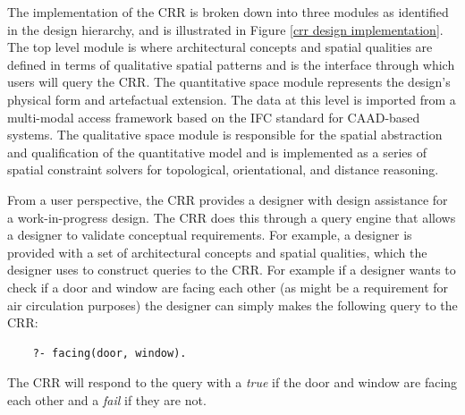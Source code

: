 \documentclass[12pt]{ucthesis}
\begin{document}
The implementation of the CRR is broken down into three modules as identified in the design hierarchy, and is illustrated in Figure \ref{crr design implementation}. The top level module is where architectural concepts and spatial qualities are defined in terms of qualitative spatial patterns and is the interface through which  users will query the CRR. The quantitative space module represents the design's physical form and artefactual extension. The data at this level is imported from a multi-modal access framework \cite{carl} based on the IFC standard for CAAD-based systems. The qualitative space module is responsible for the spatial abstraction and qualification of the quantitative model and is implemented as a series of spatial constraint solvers for topological, orientational, and distance reasoning. 

From a user perspective, the CRR provides a designer with design assistance for a work-in-progress design. The CRR does this through a query engine that allows a designer to validate conceptual requirements. For example, a designer is provided with a set of architectural concepts and spatial qualities, which the designer uses to construct queries to the CRR. For example if a designer wants to check if a door and window are facing each other (as might be a requirement for air circulation purposes) the designer can simply makes the following query to the CRR:
\begin{verbatim}
    ?- facing(door, window).
\end{verbatim} The CRR will respond to the query with a \emph{true} if the door and window are facing each other and a \emph{fail} if they are not.


\end{document}
